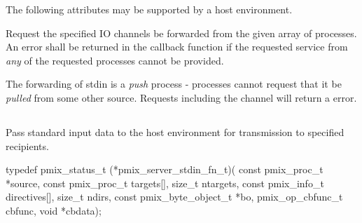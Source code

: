 \reqattrend

\optattrstart
The following attributes may be supported by a host environment.


\optattrend

\descr

Request the specified IO channels be forwarded from the given array of processes. An error shall be returned in the callback function if the requested service from \textit{any} of the requested processes cannot be provided.

\adviceimplstart
The forwarding of stdin is a \textit{push} process - processes cannot request that it be \textit{pulled} from some other source. Requests including the  channel will return a  error.
\adviceimplend


\subsection{}

\summary

Pass standard input data to the host environment for transmission to specified recipients.

\format

\cspecificstart
\begin{codepar}
typedef pmix_status_t (*pmix_server_stdin_fn_t)(
                           const pmix_proc_t *source,
                           const pmix_proc_t targets[],
                           size_t ntargets,
                           const pmix_info_t directives[],
                           size_t ndirs,
                           const pmix_byte_object_t *bo,
                           pmix_op_cbfunc_t cbfunc, void *cbdata);
\end{codepar}
\cspecificend

\begin{arglist}
\end{arglist}

